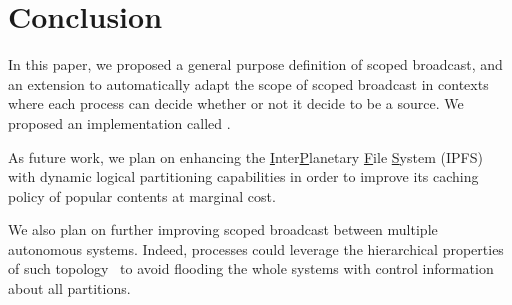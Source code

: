 
\section{Conclusion}
\label{sec:conclusion}

In this paper, we proposed a general purpose definition of scoped
broadcast, and an extension to automatically adapt the scope of scoped
broadcast in contexts where each process can decide whether or not it
decide to be a source. We proposed an implementation called \NAME.

As future work, we plan on enhancing the
\underline{I}nter\underline{P}lanetary \underline{F}ile
\underline{S}ystem (IPFS)~\cite{henningsen2020mapping} with dynamic
logical partitioning capabilities in order to improve its caching
policy of popular contents at marginal cost.

\noindent We also plan on further improving scoped broadcast between
multiple autonomous systems. Indeed, processes could leverage the
hierarchical properties of such topology~\cite{nur2018geography} to
avoid flooding the whole systems with control information about all
partitions.

